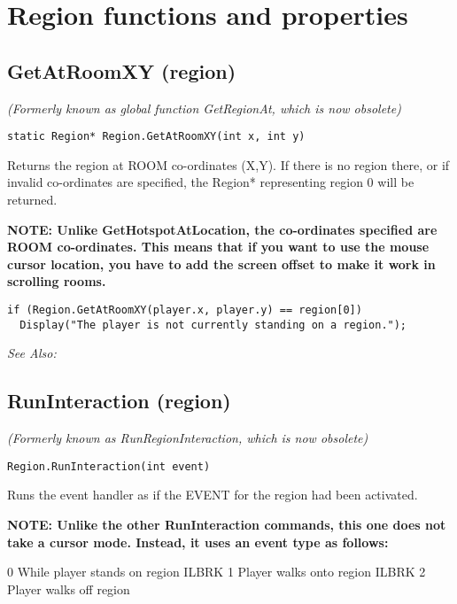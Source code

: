 \section{Region functions and properties}%


\subsection{GetAtRoomXY (region)}\label{Region.GetAtRoomXY}%

\it{(Formerly known as global function GetRegionAt, which is now obsolete)}

\begin{verbatim}
static Region* Region.GetAtRoomXY(int x, int y)
\end{verbatim}
Returns the region at ROOM co-ordinates (X,Y).
If there is no region there, or if invalid co-ordinates are specified,
the Region* representing region 0 will be returned.

\bf{NOTE:} Unlike GetHotspotAtLocation, the co-ordinates specified are ROOM co-ordinates. This
means that if you want to use the mouse cursor location, you have to add the
screen offset to make it work in scrolling rooms.

\begin{verbatim}
if (Region.GetAtRoomXY(player.x, player.y) == region[0])
  Display("The player is not currently standing on a region.");
\end{verbatim}

\it{See Also:} 


\subsection{RunInteraction (region)}\label{Region.RunInteraction}%

\it{(Formerly known as RunRegionInteraction, which is now obsolete)}

\begin{verbatim}
Region.RunInteraction(int event)
\end{verbatim}
Runs the event handler as if the EVENT for the region had been activated.

\bf{NOTE:} Unlike the other RunInteraction commands, this one does not take a cursor mode.
Instead, it uses an event type as follows:

0  While player stands on region ILBRK
1  Player walks onto region ILBRK
2  Player walks off region


